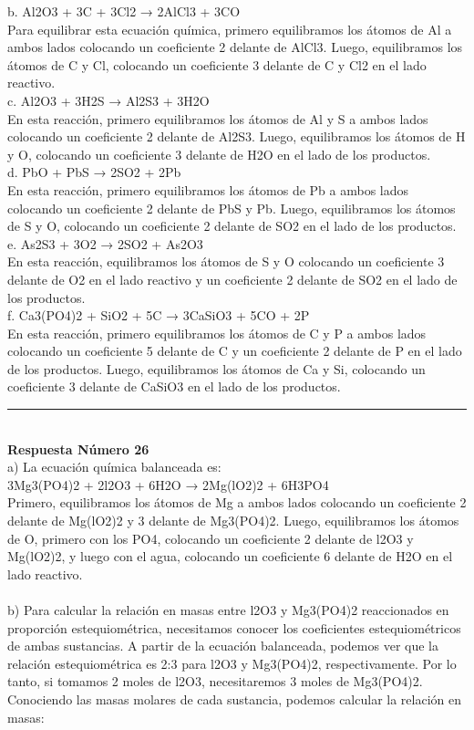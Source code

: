 \documentclass{article}
\begin{document}
b. Al2O3 + 3C + 3Cl2 → 2AlCl3 + 3CO\\
Para equilibrar esta ecuación química, primero equilibramos los átomos de Al a ambos lados colocando un coeficiente 2 delante de AlCl3. Luego, equilibramos los átomos de C y Cl, colocando un coeficiente 3 delante de C y Cl2 en el lado reactivo.\\
c. Al2O3 + 3H2S → Al2S3 + 3H2O\\
En esta reacción, primero equilibramos los átomos de Al y S a ambos lados colocando un coeficiente 2 delante de Al2S3. Luego, equilibramos los átomos de H y O, colocando un coeficiente 3 delante de H2O en el lado de los productos.\\
d. PbO + PbS → 2SO2 + 2Pb\\
En esta reacción, primero equilibramos los átomos de Pb a ambos lados colocando un coeficiente 2 delante de PbS y Pb. Luego, equilibramos los átomos de S y O, colocando un coeficiente 2 delante de SO2 en el lado de los productos.\\
e. As2S3 + 3O2 → 2SO2 + As2O3\\
En esta reacción, equilibramos los átomos de S y O colocando un coeficiente 3 delante de O2 en el lado reactivo y un coeficiente 2 delante de SO2 en el lado de los productos.\\
f. Ca3(PO4)2 + SiO2 + 5C → 3CaSiO3 + 5CO + 2P\\
En esta reacción, primero equilibramos los átomos de C y P a ambos lados colocando un coeficiente 5 delante de C y un coeficiente 2 delante de P en el lado de los productos. Luego, equilibramos los átomos de Ca y Si, colocando un coeficiente 3 delante de CaSiO3 en el lado de los productos.\\
\noindent\rule{\textwidth}{1pt} \\
\textbf{Respuesta Número 26} \\
a) La ecuación química balanceada es:\\
3Mg3(PO4)2 + 2l2O3 + 6H2O → 2Mg(lO2)2 + 6H3PO4\\
Primero, equilibramos los átomos de Mg a ambos lados colocando un coeficiente 2 delante de Mg(lO2)2 y 3 delante de Mg3(PO4)2. Luego, equilibramos los átomos de O, primero con los PO4, colocando un coeficiente 2 delante de l2O3 y Mg(lO2)2, y luego con el agua, colocando un coeficiente 6 delante de H2O en el lado reactivo.\\
\\
b) Para calcular la relación en masas entre l2O3 y Mg3(PO4)2 reaccionados en proporción estequiométrica, necesitamos conocer los coeficientes estequiométricos de ambas sustancias. A partir de la ecuación balanceada, podemos ver que la relación estequiométrica es 2:3 para l2O3 y Mg3(PO4)2, respectivamente. Por lo tanto, si tomamos 2 moles de l2O3, necesitaremos 3 moles de Mg3(PO4)2. Conociendo las masas molares de cada sustancia, podemos calcular la relación en masas:\\
\end{document}
